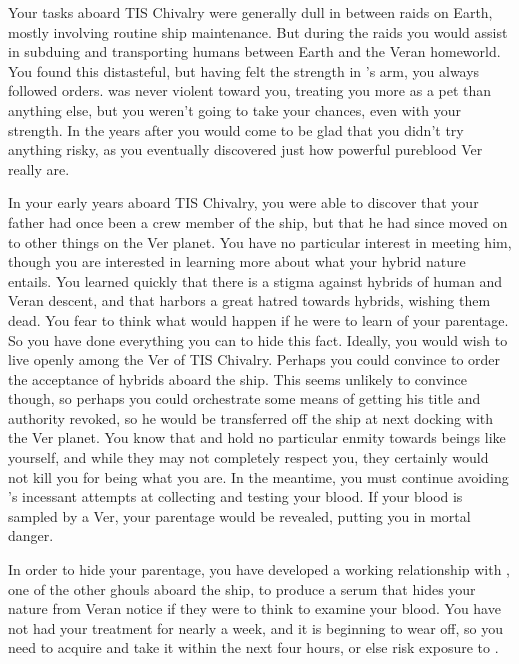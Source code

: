 \documentclass[char]{guildcamp4}
\begin{document}
Your tasks aboard TIS Chivalry were generally dull in between raids on Earth, mostly involving routine ship maintenance. But during the raids you would assist in subduing and transporting humans between Earth and the Veran homeworld. You found this distasteful, but having felt the strength in \cVone{}'s arm, you always followed orders. \cVone{} was never violent toward you, treating you more as a pet than anything else, but you weren't going to take your chances, even with your strength. In the years after you would come to be glad that you didn't try anything risky, as you eventually discovered just how powerful pureblood Ver really are.

In your early years aboard TIS Chivalry, you were able to discover that your father had once been a crew member of the ship, but that he had since moved on to other things on the Ver planet. You have no particular interest in meeting him, though you are interested in learning more about what your hybrid nature entails. You learned quickly that there is a stigma against hybrids of human and Veran descent, and that \cVthree{} harbors a great hatred towards hybrids, wishing them dead. You fear to think what would happen if he were to learn of your parentage. So you have done everything you can to hide this fact. Ideally, you would wish to live openly among the Ver of TIS Chivalry. Perhaps you could convince \cVone{} to order the acceptance of hybrids aboard the ship. This seems unlikely to convince \cVthree{} though, so perhaps you could orchestrate some means of getting his title and authority revoked, so he would be transferred off the ship at next docking with the Ver planet. You know that \cVone{} and \cVtwo{} hold no particular enmity towards beings like yourself, and while they may not completely respect you, they certainly would not kill you for being what you are. In the meantime, you must continue avoiding \cVthree{}'s incessant attempts at collecting and testing your blood. If your blood is sampled by a Ver, your parentage would be revealed, putting you in mortal danger.

In order to hide your parentage, you have developed a working relationship with \cJames{}, one of the other ghouls aboard the ship, to produce a serum that hides your nature from Veran notice if they were to think to examine your blood. You have not had your treatment for nearly a week, and it is beginning to wear off, so you need to acquire and take it within the next four hours, or else risk exposure to \cVthree{}.
\end{document}
